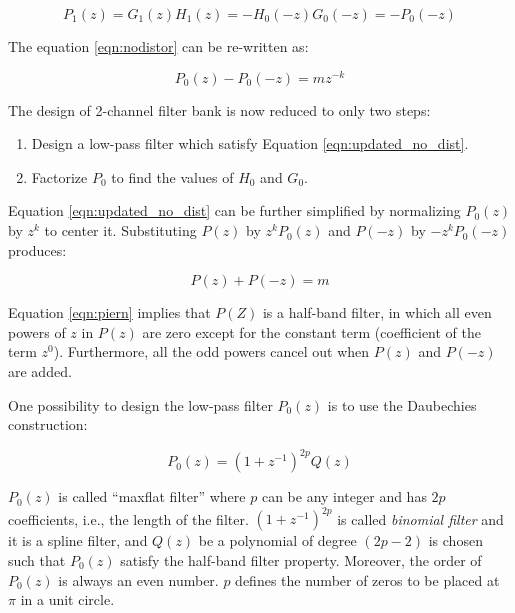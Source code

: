 \begin{equation} 
{P_1(z) = G_{1}(z)H_{1}(z) = -H_{0}(-z)G_{0}(-z) = -P_0(-z)}
\end{equation}

The equation \ref{eqn:nodistor} can be re-written as:

\begin{equation}\label{eqn:updated_no_dist} 
{P_0(z) - P_0(-z) =  mz^{-k}}
\end{equation}

The design of 2-channel filter bank is now reduced to only two steps:

\begin{enumerate}
	\item Design a low-pass filter which satisfy Equation \ref{eqn:updated_no_dist}.
	\item Factorize $P_0$ to find the values of $H_0$ and $G_0$.
\end{enumerate}

Equation \ref{eqn:updated_no_dist} can be further simplified by normalizing $P_0(z)$ by $z^k$ to center it. Substituting $P(z)$ by $z^kP_0(z)$ and $P(-z)$ by $-z^kP_0(-z)$ produces:


\begin{equation}\label{eqn:piern} 
{P(z) + P(-z) =  m}
\end{equation}

Equation \ref{eqn:piern} implies that $P(Z)$ is a half-band filter, in which all even powers of $z$ in $P(z)$ are zero except for the constant term (coefficient of the term $z^0$). Furthermore, all the odd powers cancel out when $P(z)$ and $P(-z)$ are added. 


One possibility to design the low-pass filter $P_0(z)$ is to use the Daubechies construction:

\begin{equation}\label{eqn:daubechies} 
{P_0(z) = (1 + z^{-1})^{2p}Q(z)}
\end{equation}

$P_0(z)$ is called ``maxflat filter'' where $p$ can be any integer and has $2p$ coefficients, i.e., the length of the filter. $(1 + z^{-1})^{2p}$ is called \textit{binomial filter} and it is a spline filter, and $Q(z)$ be a polynomial of degree $(2p-2)$ is chosen such that $P_0(z)$ satisfy  the half-band filter property. Moreover, the order of $P_0(z)$ is always an even number. $p$ defines the number of zeros to be placed at $\pi$ in a unit circle. 


